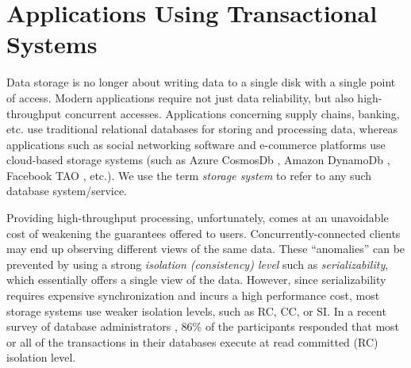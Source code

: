 \section{Applications Using Transactional Systems}

Data storage is no longer about writing data to a single
disk with a single point of access. Modern applications require not just data
reliability, but also high-throughput concurrent accesses. 
Applications concerning supply chains, banking, etc. use traditional relational databases
for storing and processing data, whereas applications such as social networking
software and e-commerce platforms 
use cloud-based storage systems (such as Azure CosmosDb \cite{cosmosdb}, Amazon DynamoDb
\cite{DBLP:conf/sosp/DeCandiaHJKLPSVV07}, Facebook TAO \cite{DBLP:conf/usenix/BronsonACCDDFGKLMPPSV13}, etc.). We use the term \textit{storage
system} to refer to any such database system/service.

Providing high-throughput processing, unfortunately, comes at an unavoidable cost of weakening 
the guarantees offered to users.
Concurrently-connected clients may end up observing different views of the same data. 
These ``anomalies'' can be prevented by using a strong \textit{isolation (consistency) level}  
such as \textit{serializability}, which essentially offers a single view of the
data. However, since serializability requires expensive synchronization and incurs a high performance cost, 
most storage systems use weaker isolation levels, such as RC, CC, or SI. 
In a recent survey of
database administrators \cite{DBLP:conf/sigmod/Pavlo17}, 86\% of the participants responded that
most or all of the transactions in their databases execute at read committed (RC) isolation level.

